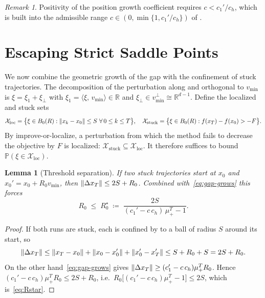 \documentclass[11pt]{article}
\theoremstyle{plain}
\newtheorem{lemma}{Lemma}[section]
\theoremstyle{definition}
\theoremstyle{remark}
\newtheorem{remark}{Remark}[section]
\DeclarePairedDelimiter{\norm}{\lVert}{\rVert}
\newcommand{\R}{\mathbb{R}}
\newcommand{\Prob}{\mathbb{P}}
\newcommand{\inner}[2]{\langle #1,\, #2\rangle}
\newcommand{\mup}{\mu_{+}}
\newcommand{\Rstar}{R_{0}^{\star}}
\begin{document}
\begin{remark}
Positivity of the position growth coefficient requires
$c<c_{1}'/c_{h}$, which is built into the admissible range
$c\in(0,\min\{1,c_{1}'/c_{h}\})$ of .
\end{remark}

\section{Escaping Strict Saddle Points}
\label{sec:escape}

We now combine the geometric growth of the gap with the confinement of
stuck trajectories. The decomposition of the perturbation along and
orthogonal to $v_{\min}$ is $\xi=\xi_{1}+\xi_{\perp}$ with
$\xi_{1}=\inner{\xi}{v_{\min}}\in\R$ and $\xi_{\perp}\in v_{\min}^{\perp}
\cong\R^{d-1}$. Define the localized and stuck sets
\[
  \mathcal{X}_{\mathrm{loc}}
  =\big\{\xi\in B_{0}(R):\norm{x_{k}-x_{0}}\le S\ \forall\,0\le k\le T\big\},
  \quad
  \mathcal{X}_{\mathrm{stuck}}
  =\big\{\xi\in B_{0}(R):f(x_{T})-f(x_{0})>-F\big\}.
\]
By improve-or-localize, a perturbation from which the method fails to
decrease the objective by $F$ is localized:
$\mathcal{X}_{\mathrm{stuck}}\subseteq\mathcal{X}_{\mathrm{loc}}$. It
therefore suffices to bound $\Prob(\xi\in\mathcal{X}_{\mathrm{loc}})$.

\begin{lemma}[Threshold separation]
\label{lem:threshold}
If two stuck trajectories start at $x_{0}$ and $x_{0}'=x_{0}+R_{0}v_{\min}$,
then $\norm{\Delta x_{T}}\le2S+R_{0}$. Combined with~\eqref{eq:gap-grows}
this forces
\begin{equation}\label{eq:Rstar}
  R_{0}\;\le\;\Rstar
  \;\coloneqq\;\frac{2S}{(c_{1}'-c\,c_{h})\,\mup^{T}-1}.
\end{equation}
\end{lemma}

\begin{proof}
If both runs are stuck, each is confined by  to a ball of
radius $S$ around its start, so
\[
  \norm{\Delta x_{T}}
  \le\norm{x_{T}-x_{0}}+\norm{x_{0}-x_{0}'}+\norm{x_{0}'-x_{T}'}
  \le S+R_{0}+S=2S+R_{0}.
\]
On the other hand~\eqref{eq:gap-grows} gives
$\norm{\Delta x_{T}}\ge(c_{1}'-c\,c_{h})\mup^{T}R_{0}$. Hence
$(c_{1}'-c\,c_{h})\mup^{T}R_{0}\le2S+R_{0}$, i.e.\
$R_{0}\big[(c_{1}'-c\,c_{h})\mup^{T}-1\big]\le2S$, which
is~\eqref{eq:Rstar}.
\end{proof}
\end{document}
